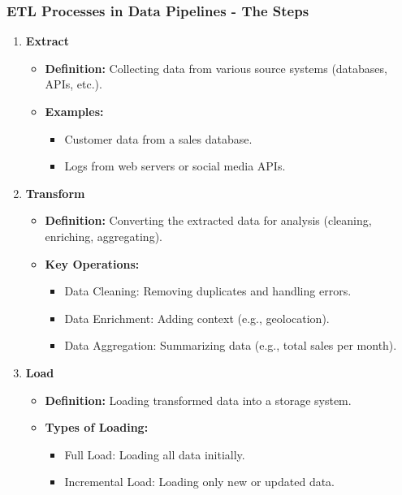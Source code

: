 \documentclass{beamer}
\begin{document}
\begin{frame}[fragile]
    \frametitle{ETL Processes in Data Pipelines - The Steps}
    \begin{enumerate}
        \item \textbf{Extract}
            \begin{itemize}
                \item \textbf{Definition:} Collecting data from various source systems (databases, APIs, etc.).
                \item \textbf{Examples:}
                    \begin{itemize}
                        \item Customer data from a sales database.
                        \item Logs from web servers or social media APIs.
                    \end{itemize}
            \end{itemize}
        \item \textbf{Transform}
            \begin{itemize}
                \item \textbf{Definition:} Converting the extracted data for analysis (cleaning, enriching, aggregating).
                \item \textbf{Key Operations:}
                    \begin{itemize}
                        \item Data Cleaning: Removing duplicates and handling errors.
                        \item Data Enrichment: Adding context (e.g., geolocation).
                        \item Data Aggregation: Summarizing data (e.g., total sales per month).
                    \end{itemize}
            \end{itemize}
        \item \textbf{Load}
            \begin{itemize}
                \item \textbf{Definition:} Loading transformed data into a storage system.
                \item \textbf{Types of Loading:}
                    \begin{itemize}
                        \item Full Load: Loading all data initially.
                        \item Incremental Load: Loading only new or updated data.
                    \end{itemize}
            \end{itemize}
    \end{enumerate}
\end{frame}
\end{document}
